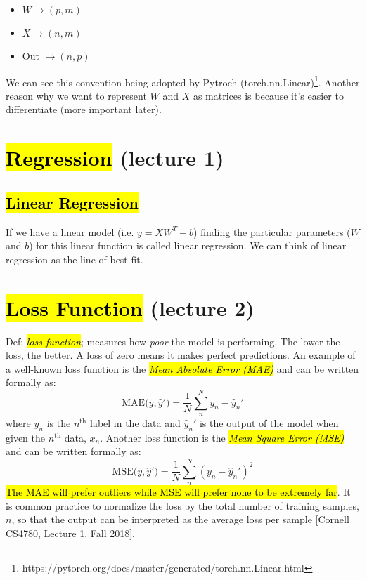 \documentclass[11pt]{article}
\newcommand{\hlinfo}[1]{{\sethlcolor{lavender}\hl{#1}}}
\begin{document}
\begin{itemize}
    \item {$W \rightarrow (p,m)$}
    \item {$X \rightarrow (n,m)$}
    \item {Out $\rightarrow (n,p)$}
\end{itemize}

We can see this convention being adopted by Pytroch (torch.nn.Linear)\footnote{https://pytorch.org/docs/master/generated/torch.nn.Linear.html}. Another reason why we want to represent $W$ and $X$ as matrices is because it's easier to differentiate (more important later). 

\section{\hl{Regression} (lecture 1)}

\subsection{\hl{Linear Regression}}

If we have a linear model (i.e. $y=XW^T+b$) finding the particular parameters ($W$ and $b$) for this linear function is called linear regression. We can think of linear regression as the line of best fit. 

\section{\hl{Loss Function} (lecture 2)}

Def: \hl{\emph{loss function}}; measures how \emph{poor} the model is performing. The lower the loss, the better. A loss of zero means it makes perfect predictions. An example of a well-known loss function is the \hlinfo{\emph{Mean Absolute Error (MAE)}} and can be written formally as:
\[\text{MAE($y, \hat{y}'$)} = \frac{1}{N}\sum_{n}^{N}{y_n - \hat{y}_n'}\]
where $y_n$ is the $n^{\text{th}}$ label in the data and $\hat{y}_n'$ is the output of the model when given the $n^{\text{th}}$ data, $x_n$. Another loss function is the \hlinfo{\emph{Mean Square Error (MSE)}} and can be written formally as:
\[\text{MSE($y, \hat{y}'$)} = \frac{1}{N}\sum_{n}^{N}{(y_n - \hat{y}_n')^2}\]
\hlinfo{The MAE will prefer outliers while MSE will prefer none to be extremely far}. It is common practice to normalize the loss by the total number of training samples, $n$, so that the output can be interpreted as the average loss per sample [Cornell CS4780, Lecture 1, Fall 2018].
\end{document}
